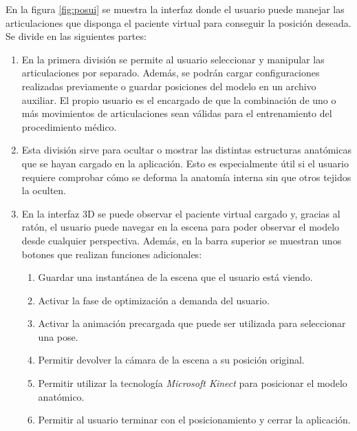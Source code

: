En la figura \ref{fig:posui} se muestra la interfaz donde el usuario puede manejar las articulaciones que disponga el paciente virtual para conseguir la posición deseada. Se divide en las siguientes partes: 
\begin{enumerate}
    \item En la primera división se permite al usuario seleccionar y manipular las articulaciones por separado. %
    Además, se podrán cargar configuraciones realizadas previamente o guardar posiciones del modelo en un archivo auxiliar. El propio usuario es el encargado de que la combinación de uno o más movimientos de articulaciones sean válidas para el entrenamiento del procedimiento médico. 
    \item Esta división sirve para ocultar o mostrar las distintas estructuras anatómicas que se hayan cargado en la aplicación. Esto es especialmente útil si el usuario requiere comprobar cómo se deforma la anatomía interna sin que otros tejidos la oculten. %
    \item En la interfaz 3D se puede observar el paciente virtual cargado y, gracias al ratón, el usuario puede navegar en la escena para poder observar el modelo desde cualquier perspectiva. Además, en la barra superior se muestran unos botones que realizan funciones adicionales:
    \begin{enumerate}
   \item Guardar una instantánea de la escena que el usuario está viendo. 
   \item Activar la fase de optimización a demanda del usuario. 
   \item Activar la animación precargada que puede ser utilizada para seleccionar una pose. 
   \item Permitir devolver la cámara de la escena a su posición original. 
   \item Permitir utilizar la tecnología \emph{Microsoft Kinect} para posicionar el modelo anatómico.
   \item   Permitir al usuario terminar con el posicionamiento y cerrar la aplicación.
    \end{enumerate}
    
\end{enumerate}
